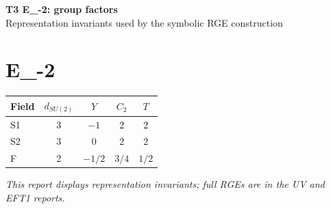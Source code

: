 \documentclass[10pt,a4paper]{article}
\begin{document}
\begin{center}
{\Large\bfseries T3 E\_-2: group factors}\\[4pt]
Representation invariants used by the symbolic RGE construction
\end{center}
\bigskip
\section*{E\_-2}
\begin{longtable}{@{}lcccc@{}}
\toprule Field & $d_{SU(2)}$ & $Y$ & $C_2$ & $T$ \\
\midrule
S1 & 3 & $-1$ & $2$ & $2$ \\
S2 & 3 & $0$ & $2$ & $2$ \\
F & 2 & $-1/2$ & $3/4$ & $1/2$ \\
\bottomrule
\end{longtable}
\emph{This report displays representation invariants; full RGEs are in the UV and EFT1 reports.}
\end{document}
